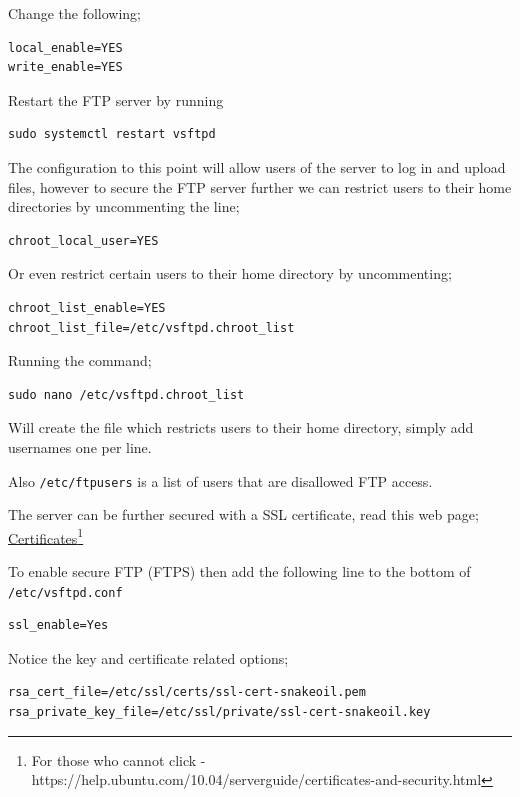 Change the following;

\begin{lstlisting}
local_enable=YES
write_enable=YES
\end{lstlisting}

Restart the FTP server by running

\begin{lstlisting}
sudo systemctl restart vsftpd
\end{lstlisting}

The configuration to this point will allow users of the server to log in and upload files, however to secure the FTP server further we can restrict users to their home directories by uncommenting the line;

\begin{lstlisting}
chroot_local_user=YES
\end{lstlisting}

Or even restrict certain users to their home directory by uncommenting;

\begin{lstlisting}
chroot_list_enable=YES
chroot_list_file=/etc/vsftpd.chroot_list
\end{lstlisting}

Running the command;

\begin{lstlisting}
sudo nano /etc/vsftpd.chroot_list
\end{lstlisting}

Will create the file which restricts users to their home directory, simply add usernames one per line.

Also \texttt{/etc/ftpusers} is a list of users that are disallowed FTP access.

The server can be further secured with a SSL certificate, read this web page; \href{https://help.ubuntu.com/10.04/serverguide/certificates-and-security.html}{Certificates}\footnote{For those who cannot click - https://help.ubuntu.com/10.04/serverguide/certificates-and-security.html}

To enable secure FTP (FTPS) then add the following line to the bottom of \texttt{/etc/vsftpd.conf}

\begin{lstlisting}
ssl_enable=Yes
\end{lstlisting}

Notice the key and certificate related options;

\begin{lstlisting}
rsa_cert_file=/etc/ssl/certs/ssl-cert-snakeoil.pem
rsa_private_key_file=/etc/ssl/private/ssl-cert-snakeoil.key
\end{lstlisting}

